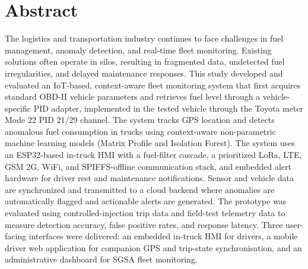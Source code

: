 \chapter*{Abstract}

The logistics and transportation industry continues to face challenges in fuel management, anomaly detection, and real-time fleet monitoring. Existing solutions often operate in silos, resulting in fragmented data, undetected fuel irregularities, and delayed maintenance responses. This study developed and evaluated an IoT-based, context-aware fleet monitoring system that first acquires standard OBD-II vehicle parameters and retrieves fuel level through a vehicle-specific PID adapter, implemented in the tested vehicle through the Toyota meter Mode 22 PID 21/29 channel. The system tracks GPS location and detects anomalous fuel consumption in trucks using context-aware non-parametric machine learning models (Matrix Profile and Isolation Forest). The system uses an ESP32-based in-truck HMI with a fuel-filter cascade, a prioritized LoRa, LTE, GSM 2G, WiFi, and SPIFFS-offline communication stack, and embedded alert hardware for driver rest and maintenance notifications. Sensor and vehicle data are synchronized and transmitted to a cloud backend where anomalies are automatically flagged and actionable alerts are generated. The prototype was evaluated using controlled-injection trip data and field-test telemetry data to measure detection accuracy, false positive rates, and response latency. Three user-facing interfaces were delivered: an embedded in-truck HMI for drivers, a mobile driver web application for companion GPS and trip-state synchronisation, and an administrative dashboard for SGSA fleet monitoring.
